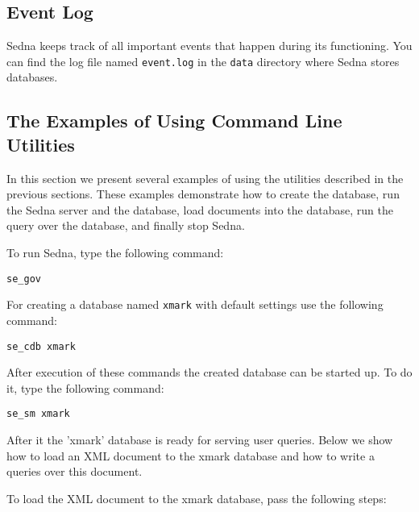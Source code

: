 \documentclass[a4paper,12pt]{article}
\begin{document}
\subsection{Event Log}
Sedna keeps track of all important events that happen during its functioning. You can find the log file named \verb!event.log! in the \verb!data! directory where Sedna stores databases. 

\subsection{The Examples of Using Command Line Utilities}

In this section we present several examples of using the utilities described in the previous sections. These examples demonstrate how to create the database, run the Sedna server and the database, load documents into the database, run the query over the database, and finally stop Sedna.

To run Sedna, type the following command:

\begin{verbatim}
se_gov
\end{verbatim}

For creating a database named \verb!xmark! with default settings use the following command:

\begin{verbatim}
se_cdb xmark
\end{verbatim}

After execution of these commands the created database can be started up. To do it, type the following command:

\begin{verbatim}
se_sm xmark
\end{verbatim}

After it the 'xmark' database is ready for serving user queries. Below we show how to load an XML document to the xmark database and how to write a queries over this document.

To load the XML document to the xmark database, pass the following steps:
\end{document}
